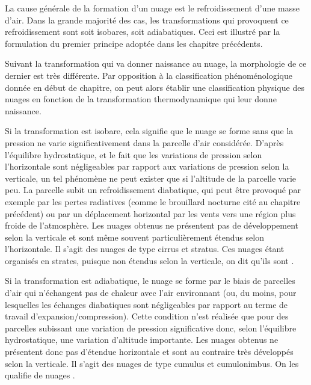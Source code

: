\sk
La cause générale de la formation d'un nuage est le refroidissement d'une masse d'air. Dans la grande majorité des cas, les transformations qui provoquent ce refroidissement sont soit isobares, soit adiabatiques. Ceci est illustré par la formulation du premier principe adoptée dans les chapitre précédents.

\sk
Suivant la transformation qui va donner naissance au nuage, la morphologie de ce dernier est très différente. Par opposition à la classification phénoménologique donnée en début de chapitre, on peut alors établir une classification physique des nuages en fonction de la transformation thermodynamique qui leur donne naissance.
\begin{finger}
\item Si la transformation est isobare, cela signifie que le nuage se forme sans que la pression ne varie significativement dans la parcelle d'air considérée. D'après l'équilibre hydrostatique, et le fait que les variations de pression selon l'horizontale sont négligeables par rapport aux variations de pression selon la verticale, un tel phénomène ne peut exister que si l'altitude de la parcelle varie peu. La parcelle subit un refroidissement diabatique, qui peut être provoqué par exemple par les pertes radiatives (comme le brouillard nocturne cité au chapitre précédent) ou par un déplacement horizontal par les vents vers une région plus froide de l'atmosphère. Les nuages obtenus ne présentent pas de développement selon la verticale et sont même souvent particulièrement étendus selon l'horizontale. Il s'agit des nuages de type cirrus et stratus. Ces nuages étant organisés en strates, puisque non étendus selon la verticale, on dit qu'ils sont .
\item Si la transformation est adiabatique, le nuage se forme par le biais de parcelles d'air qui n'échangent pas de chaleur avec l'air environnant (ou, du moins, pour lesquelles les échanges diabatiques sont négligeables par rapport au terme de travail d'expansion/compression). Cette condition n'est réalisée que pour des parcelles subissant une variation de pression significative donc, selon l'équilibre hydrostatique, une variation d'altitude importante. Les nuages obtenus ne présentent donc pas d'étendue horizontale et sont au contraire très développés selon la verticale. Il s'agit des nuages de type cumulus et cumulonimbus. On les qualifie de nuages .
\end{finger}

